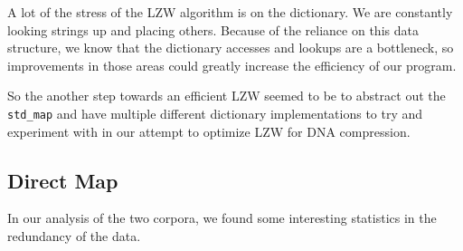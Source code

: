 \documentclass[12pt,twoside]{reedthesis}
\begin{document}
A lot of the stress of the LZW algorithm is on the dictionary. We are constantly looking strings up and placing others. Because of the reliance on this data structure, we know that the dictionary accesses and lookups are a bottleneck, so improvements in those areas could greatly increase the efficiency of our program.

So the another step towards an efficient LZW seemed to be to abstract out the \texttt{std\_map} and have multiple different dictionary implementations to try and experiment with in our attempt to optimize LZW for DNA compression.

\hypertarget{direct-map}{%
\subsection{Direct Map}\label{direct-map}}

In our analysis of the two corpora, we found some interesting statistics in the redundancy of the data.
\end{document}
